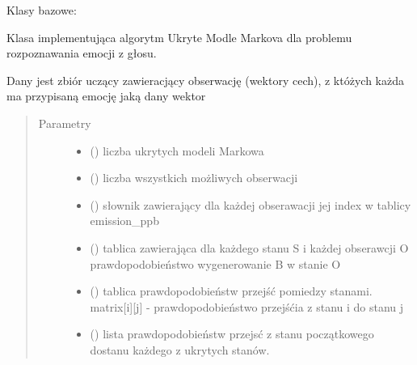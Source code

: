 \documentclass[letterpaper,10pt,polish]{sphinxmanual}
\begin{document}
\begin{fulllineitems}
\label{\detokenize{HMM:HMM.HMM}}
Klasy bazowe: 

Klasa implementująca algorytm Ukryte Modle Markova dla problemu rozpoznawania emocji z głosu.

Dany jest zbiór uczący zawieracjący obserwację (wektory cech), z któżych każda ma przypisaną emocję jaką dany wektor
\begin{quote}\begin{description}
\item[{Parametry}] \leavevmode\begin{itemize}
\item {} 
 () \textendash{} liczba ukrytych modeli Markowa

\item {} 
 () \textendash{} liczba wszystkich możliwych obserwacji

\item {} 
 () \textendash{} słownik zawierający dla każdej obserawacji jej index w tablicy emission\_ppb

\item {} 
 (\sphinxstyleliteralemphasis{{[}}\sphinxstyleliteralemphasis{{]}}\sphinxstyleliteralemphasis{{[}}\sphinxstyleliteralemphasis{{]}}) \textendash{} tablica zawierająca dla każdego stanu S
i każdej obserawcji O prawdopodobieństwo wygenerowanie B w stanie O

\item {} 
 (\sphinxstyleliteralemphasis{{[}}\sphinxstyleliteralemphasis{{]}}\sphinxstyleliteralemphasis{{[}}\sphinxstyleliteralemphasis{{]}}) \textendash{} tablica prawdopodobieństw przejść pomiedzy
stanami. matrix{[}i{]}{[}j{]} - prawdopodobieństwo przejśćia z stanu i do stanu j

\item {} 
 (\sphinxstyleliteralemphasis{{[}}\sphinxstyleliteralemphasis{{]}}) \textendash{} lista prawdopodobieństw przejsć z stanu początkowego dostanu każdego
z ukrytych stanów.


\end{itemize}
\end{description}
\end{quote}
\end{fulllineitems}
\end{document}
